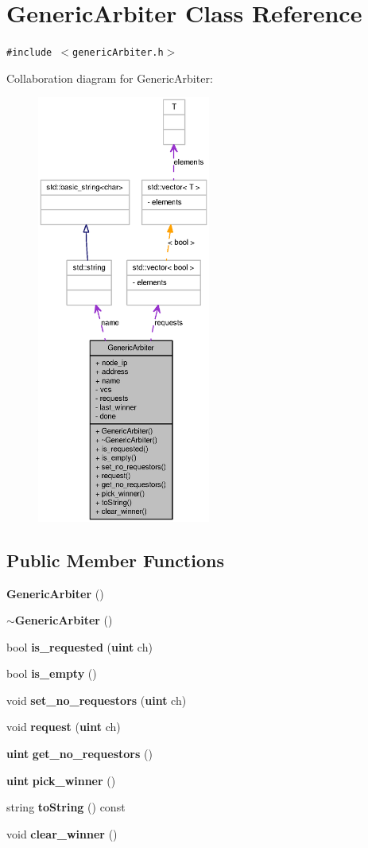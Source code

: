 \section{GenericArbiter Class Reference}
\label{classGenericArbiter}
{\tt \#include $<$genericArbiter.h$>$}

Collaboration diagram for GenericArbiter:\nopagebreak
\begin{figure}[H]
\begin{center}
\leavevmode
\includegraphics[height=400pt]{classGenericArbiter__coll__graph}
\end{center}
\end{figure}
\subsection*{Public Member Functions}
\begin{CompactItemize}
\item 
{\bf GenericArbiter} ()
\item 
{\bf $\sim$GenericArbiter} ()
\item 
bool {\bf is\_\-requested} ({\bf uint} ch)
\item 
bool {\bf is\_\-empty} ()
\item 
void {\bf set\_\-no\_\-requestors} ({\bf uint} ch)
\item 
void {\bf request} ({\bf uint} ch)
\item 
{\bf uint} {\bf get\_\-no\_\-requestors} ()
\item 
{\bf uint} {\bf pick\_\-winner} ()
\item 
string {\bf toString} () const 
\item 
void {\bf clear\_\-winner} ()
\end{CompactItemize}

